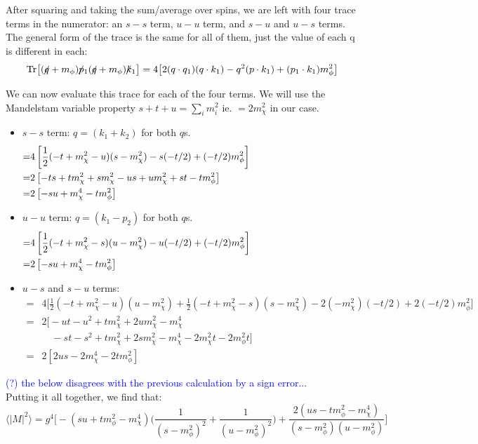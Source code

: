 \documentclass[11pt, oneside]{article}   	%
\newcommand{\fsl}[1]{\ensuremath{\mathrlap{\!\not{\phantom{#1}}}#1}}%
\begin{document}
After squaring and taking the sum/average over spins, we are left with four trace terms in the numerator: an $s-s$ term, $u-u$ term, and $s-u$ and $u-s$ terms. The general form of the trace is the same for all of them, just the value of each q is different in each:
\[ \text{Tr} \big[ (\fsl{q} + m_\phi) \fsl{p_1} (\fsl{q} + m_\phi) \fsl{k_1} \big] = 4 \big[ 2(q \cdot q_1)(q \cdot k_1) - q^2 (p \cdot k_1) + (p_1 \cdot k_1) m_\phi^2 \big] \]

We can now evaluate this trace for each of the four terms. We will use the Mandelstam variable property $s + t + u = \sum_i m_i^2$ ie. $ = 2m_\chi^2$ in our case.

\scriptsize
\begin{itemize}
\item { $s-s$ term: $q = (k_1 + k_2)$ for both $q$s.
    \begin{align*}
    = & 4 \left[ \frac{1}{2} (-t + m_\chi^2 - u)(s - m_\chi^2) - s (-t/2) + (-t/2) m_\phi^2 \right] \hspace{4.6cm} \\ 
    = & 2 \left[ -ts + tm_\chi^2 + sm_\chi^2 - us + um_\chi^2 + st - tm_\phi^2 \right] \\
    = & 2 \left[ -su + m_\chi^4 - tm_\phi^2 \right]
    \end{align*}
}
\item { $u-u$ term: $q = (k_1 - p_2)$ for both $q$s.
    \begin{align*}
    = & 4 \left[ \frac{1}{2}(-t + m_\chi^2 - s)(u - m_\chi^2) - u(-t/2) + (-t/2) m_\phi^2 \right] \hspace{4.6cm}  \\
    = & 2 \left[ -su + m_\chi^4 - tm_\phi^2 \right]
    \end{align*}
}
\item { $u-s$ and $s-u$ terms:
    \begin{align*}
    = & 4 \big[ \frac{1}{2}(-t + m_\chi^2 - u)(u-m_\chi^2) + \frac{1}{2}(-t + m_\chi^2 - s)(s-m_\chi^2) - 2(-m_\chi^2)(-t/2) + 2(-t/2)m_\phi^2 \big] \\
    = & 2 \big[ -ut - u^2 + tm_\chi^2 + 2um_\chi^2 - m_\chi^4 \\
    & \quad -st - s^2 + tm_\chi^2 + 2sm_\chi^2 - m_\chi^4 - 2m_\chi^2t - 2m_\phi^2 t \big] \\
    = & 2 \left[ 2us - 2m_\chi^4 - 2tm_\phi^2 \right]
    \end{align*}
}
\end{itemize}
\normalsize

\textcolor{blue}{(?) the below disagrees with the previous calculation by a sign error...} \\
Putting it all together, we find that: 
\[ \langle \left| M \right|^2 \rangle = g^4 \Big[ -(su + tm_\phi^2 - m_\chi^4) \big( \frac{1}{(s-m_\phi^2)^2} + \frac{1}{(u-m_\phi^2)^2} \big) + \frac{2(us - tm_\phi^2 - m_\chi^4)}{(s-m_\phi^2)(u-m_\phi^2)} \Big] \]
\end{document}
